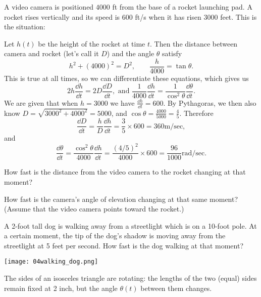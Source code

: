 \begin{multicols}{2}
\problem \groupproblem A video camera is positioned $4000$ ft from the base 
of a rocket launching pad.  A rocket rises vertically and its speed is
$600$ ft/s when it has risen $3000$ feet.
\answer 
This is the situation:
\begin{center}
  
\end{center}
Let $h(t)$ be the height of the rocket at time $t$.  Then the distance between
camera and rocket (let's call it $D$) and the angle $\theta$ satisfy
\[
h^2+ (4000)^2 = D^2, \qquad
\frac{h} {4000} = \tan \theta.
\]
This is true at all times, so we can differentiate these equations, which gives us
\[
2h\frac{\dd h} {\dd t} = 2D\frac{\dd D} {\dd t},
\text{ and }
\frac{1} {4000}\frac{\dd h} {\dd t}
= \frac{1} {\cos^2\theta} \frac{\dd\theta} {\dd t}.
\]
We are given that when $h=3000$ we have $\frac{\dd h} {\dd t} = 600$.
By Pythagoras, we then also know $D=\sqrt{3000^2 + 4000^2} = 5000$,
and $\cos \theta = \frac{4000} {5000} = \frac{4} {5}$.
Therefore
\[
\frac{\dd D} {\dd t}
= \frac{h} {D}\frac{\dd h} {\dd t}
= \frac{3} {5}\times 600
= 360  \mathrm{m}/\mathrm{sec},
\]
and
\[
\frac{\dd \theta} {\dd t}
= \frac{\cos^2\theta} {4000} \frac{\dd h} {\dd t}
= \frac{(4/5)^2} {4000}\times600
= \frac{96} {1000}  \mathrm{rad}/\mathrm{sec}.
\]
\endanswer




\subprob How fast is the distance from the video camera to the
rocket changing at that moment?




\subprob How fast is the camera's angle of elevation changing at that
same moment?  (Assume that the video camera points toward the
rocket.)








\problem \groupproblem A 2-foot tall dog is walking away from a streetlight 
which is on a 10-foot pole. At a certain moment, the tip of the dog's
shadow is moving away from the streetlight at 5 feet per second. How fast
is the dog walking at that moment?




\noindent%
\centerline{\texttt{[image: 04walking\_dog.png]}}












\problem The sides of an isosceles triangle are rotating: the lengths of 
the two (equal) sides remain fixed at 2 inch, but the angle $\theta(t)$
between them changes.





\end{multicols}
